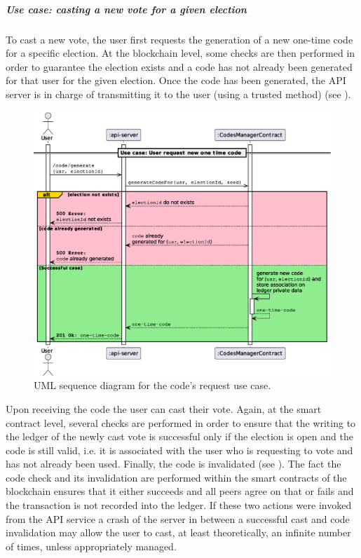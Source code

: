 \documentclass{scrartcl}
\begin{document}
\subparagraph*{Use case: casting a new vote for a given election}

To cast a new vote, the user first requests the generation of a new one-time code for a specific election.
%
At the blockchain level, some checks are then performed in order to guarantee the election exists and a code has not already been generated for that user for the given election.
%
Once the code has been generated, the API server is in charge of transmitting it to the user (using a trusted method) (see ).
%
\begin{figure}
    \centering
    \includegraphics[width=\linewidth]{figures/code-creation-use-case.eps}
    \caption{UML sequence diagram for the code's request use case.}
    \label{fig:code-creation-use-case} 
\end{figure}
%
Upon receiving the code the user can cast their vote.
%
Again, at the smart contract level, several checks are performed in order to ensure that the writing to the ledger of the newly cast vote is successful only if the election is open and the code is still valid, i.e. it is associated with the user who is requesting to vote and has not already been used. 
%
Finally, the code is invalidated (see ).
%
The fact the code check and its invalidation are performed within the smart contracts of the blockchain ensures that it either succeeds and all peers agree on that or fails and the transaction is not recorded into the ledger. 
%
If these two actions were invoked from the API service a crash of the server in between a successful cast and code invalidation may allow the user to cast, at least theoretically, an infinite number of times, unless appropriately managed.
\end{document}
